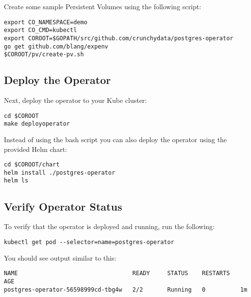 \documentclass[letterpaper,12pt]{article}
\begin{document}
Create some sample Persistent Volumes using the following script:
\vspace{.75em}
\begin{lstlisting}
export CO_NAMESPACE=demo
export CO_CMD=kubectl
export COROOT=$GOPATH/src/github.com/crunchydata/postgres-operator
go get github.com/blang/expenv
$COROOT/pv/create-pv.sh
\end{lstlisting}

\subsection{Deploy the Operator}\label{/_basic_installation/_deploy_the_operator}

Next, deploy the operator to your Kube cluster:
\vspace{.75em}
\begin{lstlisting}
cd $COROOT
make deployoperator
\end{lstlisting}

Instead of using the bash script you can also deploy the operator using the provided Helm chart:
\vspace{.75em}
\begin{lstlisting}
cd $COROOT/chart
helm install ./postgres-operator
helm ls
\end{lstlisting}

\subsection{Verify Operator Status}\label{/_basic_installation/_verify_operator_status}

To verify that the operator is deployed and running, run the following:
\vspace{.75em}
\begin{lstlisting}
kubectl get pod --selector=name=postgres-operator
\end{lstlisting}

You should see output similar to this:
\vspace{.75em}
\begin{lstlisting}
NAME                                 READY     STATUS    RESTARTS   AGE
postgres-operator-56598999cd-tbg4w   2/2       Running   0          1m
\end{lstlisting}
\end{document}
